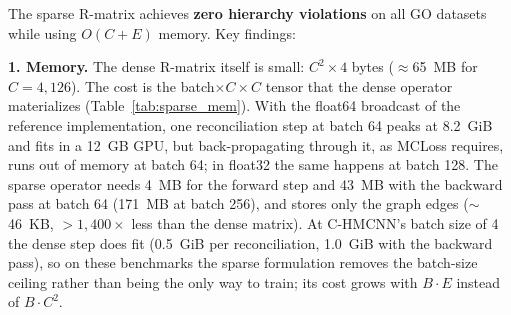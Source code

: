 \documentclass[preprint,12pt]{elsarticle}
\begin{document}
\begin{table}[!ht]
\centering
\caption{Sparse reconciliation on the 9 Gene Ontology datasets
(3,128--4,134 nodes): BCE-trained model before and after
\texttt{BlockDiagonalR} reconciliation, full protocol, mean of three
seeds.  $\Delta$ is the mean paired difference (reconciled minus raw).}
\label{tab:sparse}
\end{table}

The sparse R-matrix achieves \textbf{zero hierarchy violations}
on all GO datasets while using $O(C{+}E)$ memory.  Key findings:

\textbf{1. Memory.} The dense R-matrix itself is small: $C^2 \times 4$
bytes ($\approx$65~MB for $C{=}4{,}126$).  The cost is the
batch$\times C\times C$ tensor that the dense operator materializes
(Table~\ref{tab:sparse_mem}).  With the float64 broadcast of the
reference implementation, one reconciliation step at batch 64 peaks at
8.2~GiB and fits in a 12~GB GPU, but back-propagating through it, as
MCLoss requires, runs out of memory at batch 64; in float32 the same
happens at batch 128.  The sparse operator needs 4~MB for the forward
step and 43~MB with the backward pass at batch 64 (171~MB at batch
256), and stores only the graph edges ($\sim$46~KB, $>1{,}400\times$
less than the dense matrix).
At C-HMCNN's batch size of 4 the dense step does fit
(0.5~GiB per reconciliation, 1.0~GiB with the backward pass), so on
these benchmarks the
sparse formulation removes the batch-size ceiling rather than being the
only way to train; its cost grows with $B\cdot E$ instead of
$B\cdot C^2$.
\end{document}
